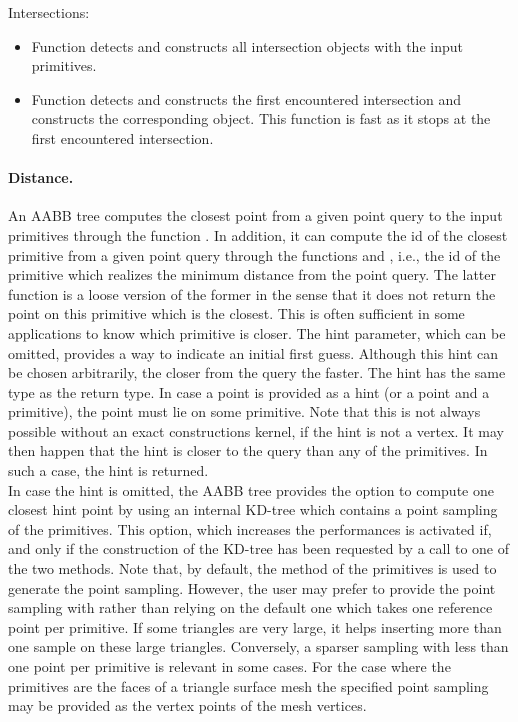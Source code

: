 Intersections:
\begin{itemize}
\item Function  detects and constructs all intersection objects with the input primitives.
\item Function  detects and constructs the first encountered intersection and constructs the corresponding object. This function is fast as it stops at the first encountered intersection.
\end{itemize}

\paragraph{Distance.} An AABB tree computes the closest point from a given point query to the input primitives through the function . In addition, it can compute the id of the closest primitive from a given point query through the functions  and , i.e., the id of the primitive which realizes the minimum distance from the point query. The latter function is a loose version of the former in the sense that it does not return the point on this primitive which is the closest. This is often sufficient in some applications to know which primitive is closer. The hint parameter, which can be omitted, provides a way to indicate an initial first guess. Although this hint can be chosen arbitrarily, the closer from the query the faster. The hint has the same type as the return type. In case a point is provided as a hint (or a point and a primitive), the point must lie on some primitive. Note that this is not always possible without an exact constructions kernel, if the hint is not a vertex. It may then happen that the hint is closer to the query than any of the primitives. In such a case, the hint is returned.\\

In case the hint is omitted, the AABB tree provides the option to compute one closest hint point by using an internal KD-tree which contains a point sampling of the primitives. This option, which increases the performances is activated if, and only if the construction of the KD-tree has been requested by a call to one of the two  methods. Note that, by default, the method  of the primitives is used to generate the point sampling. However, the user may prefer to provide the point sampling with  rather than relying on the default one which takes one reference point per primitive. If some triangles are very large, it helps inserting more than one sample on these large triangles. Conversely, a sparser sampling with less than one point per primitive is relevant in some cases. For the case where the primitives are the faces of a triangle surface mesh the specified point sampling may be provided as the vertex points of the mesh vertices.